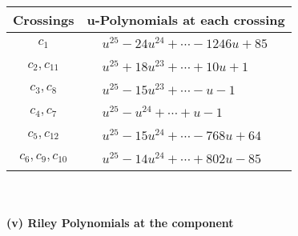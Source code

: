 \documentclass[1p]{elsarticle_modified}
\theoremstyle{definition}
\begin{document}
\begin{tabular}{m{50pt}|m{274pt}}
Crossings & \hspace{64pt}u-Polynomials at each crossing \\
\hline $$\begin{aligned}c_{1}\end{aligned}$$&$\begin{aligned}
&u^{25}-24 u^{24}+\cdots-1246 u+85
\end{aligned}$\\
\hline $$\begin{aligned}c_{2},c_{11}\end{aligned}$$&$\begin{aligned}
&u^{25}+18 u^{23}+\cdots+10 u+1
\end{aligned}$\\
\hline $$\begin{aligned}c_{3},c_{8}\end{aligned}$$&$\begin{aligned}
&u^{25}-15 u^{23}+\cdots- u-1
\end{aligned}$\\
\hline $$\begin{aligned}c_{4},c_{7}\end{aligned}$$&$\begin{aligned}
&u^{25}- u^{24}+\cdots+u-1
\end{aligned}$\\
\hline $$\begin{aligned}c_{5},c_{12}\end{aligned}$$&$\begin{aligned}
&u^{25}-15 u^{24}+\cdots-768 u+64
\end{aligned}$\\
\hline $$\begin{aligned}c_{6},c_{9},c_{10}\end{aligned}$$&$\begin{aligned}
&u^{25}-14 u^{24}+\cdots+802 u-85
\end{aligned}$\\
\hline
\end{tabular}\\~\\
\newpage\renewcommand{\arraystretch}{1}
\flushleft \textbf{(v) Riley Polynomials at the component}\newline \\
\end{document}
